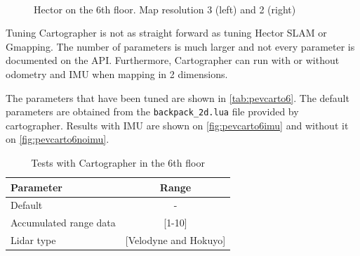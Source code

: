 \begin{figure}[htb]
   \\ 
  \caption[Hector on the 6th floor]{Hector on the 6th floor. Map resolution 3 (left) and 2 (right)}
  \label{fig:pevhe6var}
\end{figure}

 Tuning Cartographer is not as straight forward as tuning Hector SLAM or Gmapping. The number of parameters is much larger and not every parameter is documented on the API. Furthermore, Cartographer can run with or without odometry and IMU when mapping in 2 dimensions.

The parameters that have been tuned are shown in \autoref{tab:pevcarto6}. The default parameters are obtained from the \texttt{backpack\_2d.lua} file provided by cartographer. Results with IMU are shown on \autoref{fig:pevcarto6imu} and without it on \autoref{fig:pevcarto6noimu}.
\begin{table}[h!]
  \centering
  \begin{tabular}{lc}
  \hline
  \textbf{Parameter} & \textbf{Range} \\ \hline
  Default & - \\ \hline
  Accumulated range data & {[}1-10{]} \\ \hline
  Lidar type & {[}Velodyne and Hokuyo{]} \\ \hline
  \end{tabular}
  \caption{Tests with Cartographer in the 6th floor}
  \label{tab:pevcarto6}
\end{table}

